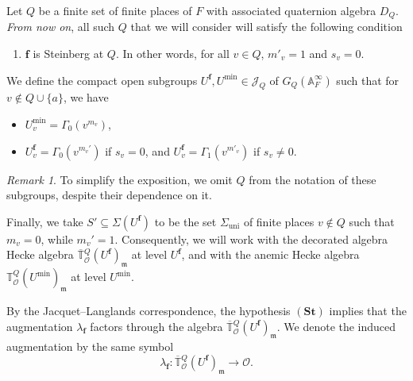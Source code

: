\documentclass[a4paper, notitlepage, 10pt]{amsart}
\theoremstyle{plain} %
\theoremstyle{definition} %
\theoremstyle{remark} %
\newtheorem{remark}[theorem]{Remark}
\numberwithin{equation}{section}
\newcommand{\bbA}{\mathbb A}
\newcommand{\uni}{\operatorname{uni}}
\begin{document}
\subsubsection{} Let $Q$ be a finite set of finite places of $F$ with associated quaternion algebra $D_Q$. \emph{From now on}, all such $Q$ that we will consider will satisfy the following condition
\begin{enumerate}
    \item[$(\mathbf{St})$] $\mathbf{f}$ is Steinberg at $Q$. In other words, for all $ v\in Q$, $m'_v= 1$ and $s_v=0$.
\end{enumerate}
 We define the compact open subgroups $U^{\mathbf{f}},U^{\min}\in \mathcal{J}_Q$ of $G_Q(\bbA_F^\infty)$ such that for $v\not\in Q\cup\{a\}$, we have
\begin{itemize}
    \item $U^{\min}_v=\Gamma_0(v^{m_v})$,
    \item $U^{\mathbf{f}}_v=\Gamma_0(v^{m_v'})$ if $s_v=0$, and $U^{\mathbf{f}}_v=\Gamma_1(v^{m'_v})$ if $s_v\neq 0$.
\end{itemize}
\begin{remark}
    To simplify the exposition, we omit $Q$ from the notation of these subgroups, despite their dependence on it.
\end{remark}

Finally, we take $S'\subseteq \Sigma(U^{\mathbf{f}})$ to be the set $\Sigma_{\uni}$ of finite places $v\not\in Q$ such that $m_v=0$, while $m_v'=1$. Consequently, we will work with the decorated algebra Hecke algebra $\overline{\mathbb{T}}{}^{Q}_{\mathcal{O}}(U^{\mathbf{f}})_{\mathfrak{m}}$ at level $U^{\mathbf{f}}$, and with the anemic Hecke algebra $\mathbb{T}^{Q}_{\mathcal{O}}(U^{\min})_{\mathfrak{m}}$ at level $U^{\min}$.

By the Jacquet--Langlands correspondence, the hypothesis $(\textbf{St})$ implies that the augmentation $\lambda_{\mathbf{f}}$ factors through the algebra $\overline{\mathbb{T}}{}^{Q}_{\mathcal{O}}(U^{\mathbf{f}})_{\mathfrak{m}}$. We denote the induced augmentation by the same symbol
$$ \lambda_{\mathbf{f}}\colon \overline{\mathbb{T}}{}^{Q}_{\mathcal{O}}(U^{\mathbf{f}})_{\mathfrak{m}}\longrightarrow \mathcal{O}. $$
\end{document}
